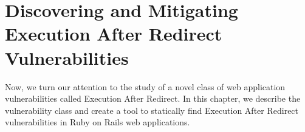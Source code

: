 \chapter{Discovering and Mitigating Execution After Redirect Vulnerabilities}
\label{fear-the-ear}

Now, we turn our attention to the study of a novel class of
web application vulnerabilities called Execution After Redirect. In
this chapter, we describe the vulnerability class and create a tool to
statically find Execution After Redirect vulnerabilities in Ruby on
Rails web applications.
\\



